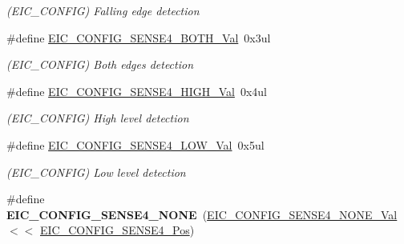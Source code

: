\begin{DoxyCompactItemize}
\begin{DoxyCompactList}\small\item\em (E\+I\+C\+\_\+\+C\+O\+N\+F\+I\+G) Falling edge detection \end{DoxyCompactList}\item 
\hypertarget{group___s_a_m_l21___e_i_c_ga90038bdcd72cf77acd74f46032eb292c}{}\#define \hyperlink{group___s_a_m_l21___e_i_c_ga90038bdcd72cf77acd74f46032eb292c}{E\+I\+C\+\_\+\+C\+O\+N\+F\+I\+G\+\_\+\+S\+E\+N\+S\+E4\+\_\+\+B\+O\+T\+H\+\_\+\+Val}~0x3ul\label{group___s_a_m_l21___e_i_c_ga90038bdcd72cf77acd74f46032eb292c}

\begin{DoxyCompactList}\small\item\em (E\+I\+C\+\_\+\+C\+O\+N\+F\+I\+G) Both edges detection \end{DoxyCompactList}\item 
\hypertarget{group___s_a_m_l21___e_i_c_gaf61da74ee963e779f81a0fa2f81e9c75}{}\#define \hyperlink{group___s_a_m_l21___e_i_c_gaf61da74ee963e779f81a0fa2f81e9c75}{E\+I\+C\+\_\+\+C\+O\+N\+F\+I\+G\+\_\+\+S\+E\+N\+S\+E4\+\_\+\+H\+I\+G\+H\+\_\+\+Val}~0x4ul\label{group___s_a_m_l21___e_i_c_gaf61da74ee963e779f81a0fa2f81e9c75}

\begin{DoxyCompactList}\small\item\em (E\+I\+C\+\_\+\+C\+O\+N\+F\+I\+G) High level detection \end{DoxyCompactList}\item 
\hypertarget{group___s_a_m_l21___e_i_c_ga92370d05cd0d822893f57ecf0ff7a2a5}{}\#define \hyperlink{group___s_a_m_l21___e_i_c_ga92370d05cd0d822893f57ecf0ff7a2a5}{E\+I\+C\+\_\+\+C\+O\+N\+F\+I\+G\+\_\+\+S\+E\+N\+S\+E4\+\_\+\+L\+O\+W\+\_\+\+Val}~0x5ul\label{group___s_a_m_l21___e_i_c_ga92370d05cd0d822893f57ecf0ff7a2a5}

\begin{DoxyCompactList}\small\item\em (E\+I\+C\+\_\+\+C\+O\+N\+F\+I\+G) Low level detection \end{DoxyCompactList}\item 
\hypertarget{group___s_a_m_l21___e_i_c_gab7d82940b55cdc2637827b449febf0a6}{}\#define {\bfseries E\+I\+C\+\_\+\+C\+O\+N\+F\+I\+G\+\_\+\+S\+E\+N\+S\+E4\+\_\+\+N\+O\+N\+E}~(\hyperlink{group___s_a_m_l21___e_i_c_ga4317fae5e621e618c7e7bdf654a1b2b0}{E\+I\+C\+\_\+\+C\+O\+N\+F\+I\+G\+\_\+\+S\+E\+N\+S\+E4\+\_\+\+N\+O\+N\+E\+\_\+\+Val}    $<$$<$ \hyperlink{group___s_a_m_l21___e_i_c_gad23c76b1fbf7d30fa3aa738a38c453c3}{E\+I\+C\+\_\+\+C\+O\+N\+F\+I\+G\+\_\+\+S\+E\+N\+S\+E4\+\_\+\+Pos})\label{group___s_a_m_l21___e_i_c_gab7d82940b55cdc2637827b449febf0a6}


\end{DoxyCompactItemize}
